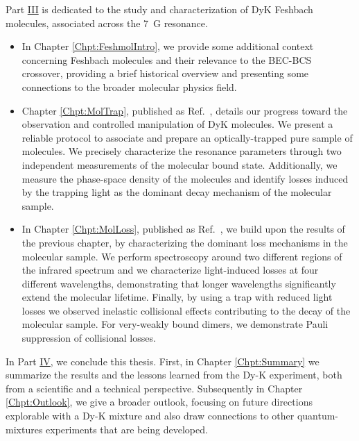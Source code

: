 Part \hyperref[pt:MakingProbing]{III} is dedicated to the study and characterization of DyK Feshbach molecules, associated across the \SI{7}{G} resonance.

\begin{itemize}
	\item In Chapter \ref{Chpt:FeshmolIntro}, we provide some additional context concerning Feshbach molecules and their relevance to the \ac{BEC}-\ac{BCS} crossover, providing a brief historical overview and presenting some connections to the broader molecular physics field.
	
	\item Chapter \ref{Chpt:MolTrap}, published as Ref.~\cite{Soave2023otf}, details our progress toward the observation and controlled manipulation of DyK molecules. We present a reliable protocol to associate and prepare an optically-trapped pure sample of molecules. We precisely characterize the resonance parameters through two independent measurements of the molecular bound state. Additionally, we measure the phase-space density of the molecules and identify losses induced by the trapping light as the dominant decay mechanism of the molecular sample.
	
	
	\item In Chapter \ref{Chpt:MolLoss}, published as Ref.~\cite{Canali2026otf}, we build upon the results of the previous chapter, by characterizing the dominant loss mechanisms in the molecular sample. We perform spectroscopy around two different regions of the infrared spectrum and we characterize light-induced losses at four different wavelengths, demonstrating that longer wavelengths significantly extend the molecular lifetime. Finally, by using a trap with reduced light losses we observed inelastic collisional effects contributing to the decay of the molecular sample. For very-weakly bound dimers, we demonstrate Pauli suppression of collisional losses. 
	
\end{itemize}



In Part \hyperref[pt:End]{IV}, we conclude this thesis. First, in Chapter \ref{Chpt:Summary} we summarize the results and the lessons learned from the Dy-K experiment, both from a scientific and a technical perspective. Subsequently in Chapter \ref{Chpt:Outlook}, we give a broader outlook, focusing on future directions explorable with a Dy-K mixture and also draw connections to other quantum-mixtures experiments that are being developed. 
